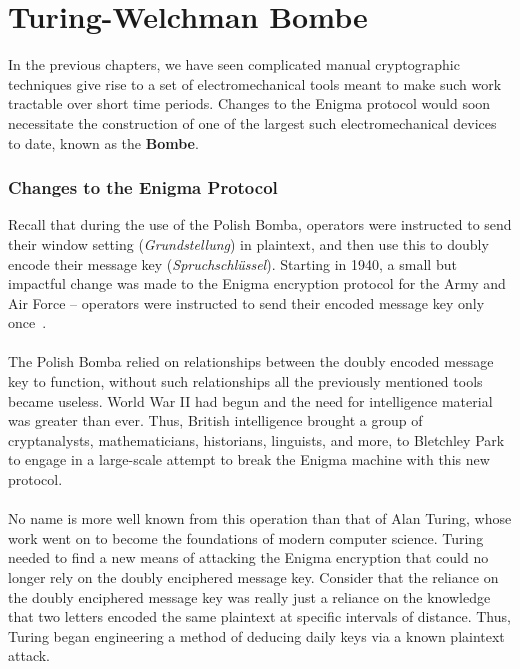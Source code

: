 

\chapter{Turing-Welchman Bombe}

In the previous chapters, we have seen complicated manual
cryptographic techniques give rise to a set of electromechanical
tools meant to make such work tractable over short time periods.
Changes to the Enigma protocol would soon necessitate the
construction of one of the largest such electromechanical devices to
date, known as the {\bf{Bombe}}.

\subsection{Changes to the Enigma Protocol}
Recall that during the use of the Polish Bomba, operators were
instructed to send their window setting (\emph{Grundstellung}) in
plaintext, and then use this to doubly encode their message key
(\emph{Spruchschlüssel}). Starting in 1940, a small but impactful
change was made to the Enigma encryption protocol for the Army and
Air Force -- operators were instructed to send their encoded message
key only once~\cite[pp.~331--332]{rijmenants2010enigma}.
\\\\The Polish Bomba relied on relationships between the doubly
encoded message key to function, without such relationships all the
previously mentioned tools became useless. World War II had begun and
the need for intelligence material was greater than ever. Thus,
British intelligence brought a group of cryptanalysts,
mathematicians, historians, linguists, and more, to Bletchley Park to
engage in a large-scale attempt to break the Enigma machine with this
new protocol.
\\\\No name is more well known from this operation than that of Alan
Turing, whose work went on to become the foundations of modern
computer science. Turing needed to find a new means of attacking the
Enigma encryption that could no longer rely on the doubly enciphered
message key. Consider that the reliance on the doubly enciphered
message key was really just a reliance on the knowledge that two
letters encoded the same plaintext at specific intervals of distance.
Thus, Turing began engineering a method of deducing daily keys via a
known plaintext attack.

